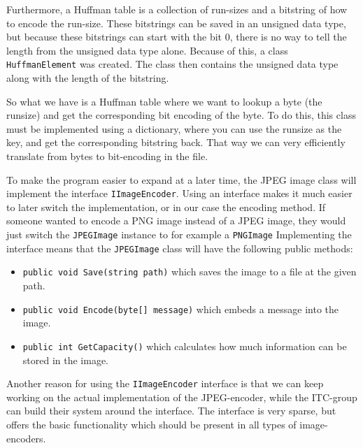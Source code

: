 Furthermore, a Huffman table is a collection of run-sizes and a bitstring of how to encode the run-size.
These bitstrings can be saved in an unsigned data type, but because these bitstrings can start with the bit 0, there is no way to tell the length from the unsigned data type alone.
Because of this, a class \lstinline|HuffmanElement| was created.
The class then contains the unsigned data type along with the length of the bitstring.

So what we have is a Huffman table where we want to lookup a byte (the runsize) and get the corresponding bit encoding of the byte. To do this, this class must be implemented using a dictionary, where you can use the runsize as the key, and get the corresponding bitstring back. That way we can very efficiently translate from bytes to bit-encoding in the file. 


To make the program easier to expand at a later time, the JPEG image class will implement the interface \lstinline|IImageEncoder|. Using an interface makes it much easier to later switch the implementation, or in our case the encoding method. If someone wanted to encode a PNG image instead of a JPEG image, they would just switch the \lstinline|JPEGImage| instance to for example a \lstinline|PNGImage|
Implementing the interface means that the \lstinline|JPEGImage| class will have the following public methods:

\begin{itemize}
	\item \lstinline|public void Save(string path)| which saves the image to a file at the given path.
	\item \lstinline|public void Encode(byte[] message)| which embeds a message into the image.
	\item \lstinline|public int GetCapacity()| which calculates how much information can be stored in the image.
\end{itemize}

Another reason for using the \lstinline|IImageEncoder| interface is that we can keep working on the actual implementation of the JPEG-encoder, while the ITC-group can build their system around the interface. The interface is very sparse, but offers the basic functionality which should be present in all types of image-encoders.